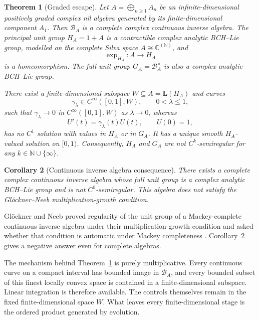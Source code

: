 \documentclass[11pt]{article}
\newtheorem{theorem}{Theorem}[section]
\newtheorem{corollary}[theorem]{Corollary}
\theoremstyle{remark}
\begin{document}
\begin{theorem}[Graded escape]
\label{thm:graded-escape}
Let $A=\bigoplus_{n\geq1}A_n$ be an infinite-dimensional positively graded
complex nil algebra generated by its finite-dimensional component $A_1$.
Then $\mathcal B_A$ is a complete complex continuous inverse algebra.  The
principal unit group $H_A=1+A$ is a contractible complex analytic BCH--Lie
group, modelled on the complete Silva space
$A\cong\mathbb C^{(\mathbb N)}$, and
\[
  \exp_{H_A}:A\longrightarrow H_A
\]
is a homeomorphism.  The full unit group $G_A=\mathcal B_A^\times$ is also a
complex analytic BCH--Lie group.

There exist a finite-dimensional subspace $W\subseteq A=\mathbf L(H_A)$ and
curves
\[
  \gamma_\lambda\in C^\infty([0,1],W),
  \qquad 0<\lambda\leq1,
\]
such that $\gamma_\lambda\to0$ in $C^\infty([0,1],W)$ as $\lambda\to0$,
whereas
\begin{equation}
  U'(t)=\gamma_\lambda(t)U(t),
  \qquad U(0)=1,
  \label{eq:bad-ivp-intro}
\end{equation}
has no $C^1$ solution with values in $H_A$ or in $G_A$.  It has a unique
smooth $H_A$-valued solution on $[0,1)$.  Consequently, $H_A$ and $G_A$ are
not $C^k$-semiregular for any $k\in\mathbb N\cup\{\infty\}$.
\end{theorem}

\begin{corollary}[Continuous inverse algebra consequence]
\label{cor:cia-consequence}
There exists a complete complex continuous inverse algebra whose full unit
group is a complex analytic BCH--Lie group and is not $C^0$-semiregular.  This
algebra does not satisfy the Gl\"ockner--Neeb multiplication-growth
condition.
\end{corollary}

Gl\"ockner and Neeb proved regularity of the unit group of a Mackey-complete
continuous inverse algebra under their multiplication-growth condition and
asked whether that condition is automatic under Mackey completeness
\cite[Remark~E(b)]{GlocknerNeebCIA}.  Corollary~\ref{cor:cia-consequence}
gives a negative answer even for complete algebras.

The mechanism behind Theorem~\ref{thm:graded-escape} is purely
multiplicative.  Every continuous curve on a compact interval has bounded
image in $\mathcal B_A$, and every bounded subset of this finest locally
convex space is contained in a finite-dimensional subspace.  Linear
integration is therefore available.  The controls themselves remain in the
fixed finite-dimensional space $W$.  What leaves every finite-dimensional
stage is the ordered product generated by evolution.
\end{document}
